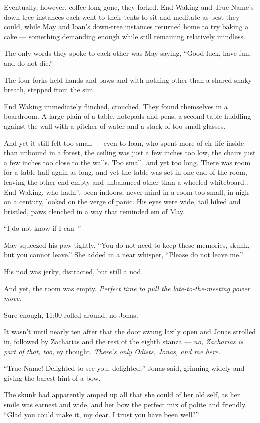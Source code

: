 Eventually, however, coffee long gone, they forked. End Waking and True Name's down-tree instances each went to their tents to sit and meditate as best they could, while May and Ioan's down-tree instances returned home to try baking a cake — something demanding enough while still remaining relatively mindless.

The only words they spoke to each other was May saying, ``Good luck, have fun, and do not die.''

The four forks held hands and paws and with nothing other than a shared shaky breath, stepped from the sim.

End Waking immediately flinched, crouched. They found themselves in a boardroom. A large plain of a table, notepads and pens, a second table huddling against the wall with a pitcher of water and a stack of too-small glasses.

And yet it still felt too small — even to Ioan, who spent more of eir life inside than unbound in a forest, the ceiling was just a few inches too low, the chairs just a few inches too close to the walls. Too small, and yet too long. There was room for a table half again as long, and yet the table was set in one end of the room, leaving the other end empty and unbalanced other than a wheeled whiteboard.. End Waking, who hadn't been indoors, never mind in a room too small, in nigh on a century, looked on the verge of panic. His eyes were wide, tail hiked and bristled, paws clenched in a way that reminded em of May.

``I do not know if I can--''

May squeezed his paw tightly. ``You do not need to keep these memories, skunk, but you cannot leave.'' She added in a near whisper, ``Please do not leave me.''

His nod was jerky, distracted, but still a nod.

And yet, the room was empty. \emph{Perfect time to pull the late-to-the-meeting power move.}

Sure enough, 11:00 rolled around, no Jonas.

It wasn't until nearly ten after that the door swung lazily open and Jonas strolled in, followed by Zacharias and the rest of the eighth stanza — \emph{no, Zacharias is part of that, too,} ey thought. \emph{There's only Odists, Jonas, and me here.}

``True Name! Delighted to see you, delighted,'' Jonas said, grinning widely and giving the barest hint of a bow.

The skunk had apparently amped up all that she could of her old self, as her smile was earnest and wide, and her bow the perfect mix of polite and friendly. ``Glad you could make it, my dear. I trust you have been well?''

